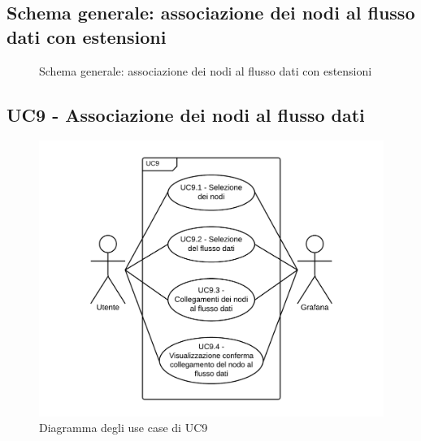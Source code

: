 \subsection{Schema generale: associazione dei nodi al flusso dati con estensioni}
\begin{figure}[H]
\caption{Schema generale: associazione dei nodi al flusso dati con estensioni}
\end{figure}
\subsection{UC9 - Associazione dei nodi al flusso dati}
\begin{figure}[H]
\includegraphics{img/UC9_-_Associazione_dei_nodi_al_flusso_dati.png}
\caption{Diagramma degli use case di UC9}
\end{figure}
